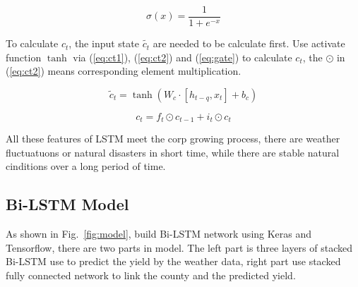 \documentclass[conference]{IEEEtran}
\begin{document}
\begin{equation}
  \sigma \left( x \right) =\frac{1}{1+e^{-x}}
  \label{eq:sigmoid}
\end{equation}

To calculate $c_t$, the input state $\widetilde{c_t}$ are needed to be calculate first. Use activate function $\tanh$ via (\ref{eq:ct1}), (\ref{eq:ct2}) and (\ref{eq:gate}) to calculate $c_t$, the $\odot$ in (\ref{eq:ct2}) means corresponding element multiplication.

\begin{equation}
  \tilde{c}_t=\tanh \left( W_c\cdot \left[ h_{t-q},x_t \right] +b_c \right)
  \label{eq:ct1}
\end{equation}

\begin{equation}
  c_t=f_t\odot c_{t-1}+i_t\odot c_t
  \label{eq:ct2}
\end{equation}

All these features of LSTM meet the corp growing process, there are weather fluctuatuons or natural disasters in short time, while there are stable natural cinditions over a long period of time.

\subsection{Bi-LSTM Model}
As shown in Fig.~\ref{fig:model}, build Bi-LSTM network using Keras and Tensorflow, there are two parts in model. The left part is three layers of stacked Bi-LSTM use to predict the yield by the weather data, right part use stacked fully connected network to link the county and the predicted yield.
\end{document}
